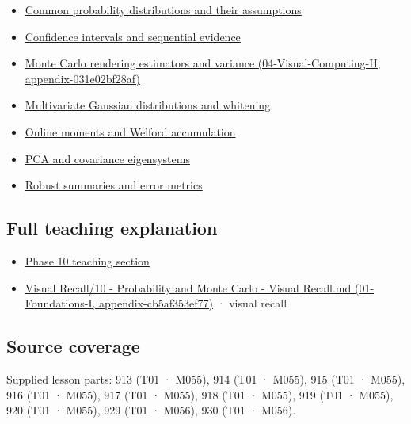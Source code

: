 \begin{itemize}
\tightlist
\item
  \hyperref[appendix-a2360b435383]{Common probability distributions and their assumptions}
\item
  \hyperref[appendix-c83016554b1e]{Confidence intervals and sequential evidence}
\item
  \href{../04-Visual-Computing-II/main.pdf\#nameddest=appendix-031e02bf28af}{Monte Carlo rendering estimators and variance (04-Visual-Computing-II, appendix-031e02bf28af)}
\item
  \hyperref[appendix-12bbe185dbe5]{Multivariate Gaussian distributions and whitening}
\item
  \hyperref[appendix-33237f0f618b]{Online moments and Welford accumulation}
\item
  \hyperref[appendix-ad175ef3c5bf]{PCA and covariance eigensystems}
\item
  \hyperref[appendix-bcc44e9d3d02]{Robust summaries and error metrics}
\end{itemize}

\subsection{Full teaching explanation}\label{appendix-54c383df9992-full-teaching-explanation}

\begin{itemize}
\tightlist
\item
  \hyperref[02-foundations-ii-ch023-expected-values-describe-centers-covariance-describes-dependence]{Phase 10 teaching section}
\item
  \href{../01-Foundations-I/main.pdf\#nameddest=appendix-cb5af353ef77}{Visual Recall/10 - Probability and Monte Carlo - Visual Recall.md (01-Foundations-I, appendix-cb5af353ef77)} · visual recall
\end{itemize}

\subsection{Source coverage}\label{appendix-54c383df9992-source-coverage}

Supplied lesson parts: 913 (T01 · M055), 914 (T01 · M055), 915 (T01 · M055), 916 (T01 · M055), 917 (T01 · M055), 918 (T01 · M055), 919 (T01 · M055), 920 (T01 · M055), 929 (T01 · M056), 930 (T01 · M056).
